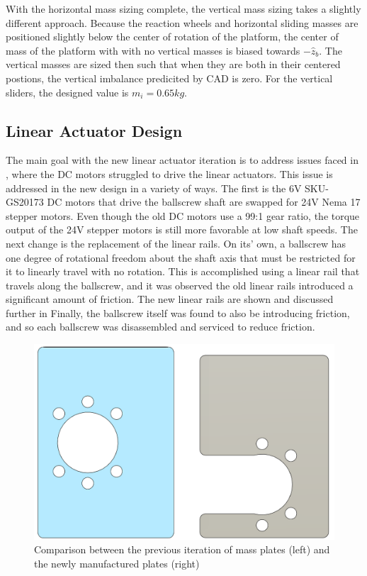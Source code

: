 With the horizontal mass sizing complete, the vertical mass sizing takes a slightly different approach. Because the reaction wheels and horizontal sliding masses are positioned slightly below the center of rotation of the platform, the center of mass of the platform with with no vertical masses is biased towards $-\hat{z}_b$. The vertical masses are sized then such that when they are both in their centered postions, the vertical imbalance predicited by CAD is zero. For the vertical sliders, the designed value is $m_i = 0.65kg$. 


\subsection{Linear Actuator Design}

The main goal with the new linear actuator iteration is to address issues faced in \cite{gilman_automatic_2024}, where the DC motors struggled to drive the linear actuators. This issue is addressed in the new design in a variety of ways. The first is the 6V SKU-GS20173 DC motors that drive the ballscrew shaft are swapped for 24V Nema 17 stepper motors. Even though the old DC motors use a 99:1 gear ratio, the torque output of the 24V stepper motors is still more favorable at low shaft speeds. The next change is the replacement of the linear rails. On its' own, a ballscrew has one degree of rotational freedom about the shaft axis that must be restricted for it to linearly travel with no rotation. This is accomplished using a linear rail that travels along the ballscrew, and it was observed the old linear rails introduced a significant amount of friction. The new linear rails are shown and discussed further in  Finally, the ballscrew itself was found to also be introducing friction, and so each ballscrew was disassembled and serviced to reduce friction.

\begin{figure}[h]
    \centering
    \includegraphics[width=0.8\linewidth]{figures/plate_comparison.png}
    \caption{Comparison between the previous iteration of mass plates (left) and the newly manufactured plates (right)}
    \label{fig:plate_comparison}
\end{figure}

